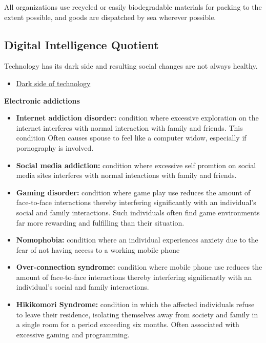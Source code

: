 \documentclass[]{book}
\providecommand{\tightlist}{%
  \setlength{\itemsep}{0pt}\setlength{\parskip}{0pt}}
\let\BeginKnitrBlock\begin \let\EndKnitrBlock\end
\begin{document}
All organizations use recycled or easily biodegradable materials for packing to the extent possible, and goods are dispatched by sea wherever possible.

\hypertarget{digital-intelligence-quotient}{%
\subsection{Digital Intelligence Quotient}\label{digital-intelligence-quotient}}

Technology has its dark side and resulting social changes are not always healthy.

\begin{itemize}
\tightlist
\item
  \href{https://youtu.be/J7cYcesGLcY}{Dark side of technology}
\end{itemize}

\BeginKnitrBlock{rmdextra}
\textbf{Electronic addictions}

\begin{itemize}
\tightlist
\item
  \textbf{Internet addiction disorder:} condition where excessive exploration on the internet interferes with normal interaction with family and friends. This condition Often causes spouse to feel like a computer widow, especially if pornography is involved.
\item
  \textbf{Social media addiction:} condition where excessive self promtion on social media sites interferes with normal inteactions with family and friends.
\item
  \textbf{Gaming disorder:} condition where game play use reduces the amount of face-to-face interactions thereby interfering significantly with an individual's social and family interactions. Such individuals often find game environments far more rewarding and fulfilling than their situation.
\item
  \textbf{Nomophobia:} condition where an individual experiences anxiety due to the fear of not having access to a working mobile phone
\item
  \textbf{Over-connection syndrome:} condition where mobile phone use reduces the amount of face-to-face interactions thereby interfering significantly with an individual's social and family interactions.
\item
  \textbf{Hikikomori Syndrome:} condition in which the affected individuals refuse to leave their residence, isolating themselves away from society and family in a single room for a period exceeding six months. Often associated with excessive gaming and programming.
\end{itemize}
\EndKnitrBlock{rmdextra}
\end{document}
